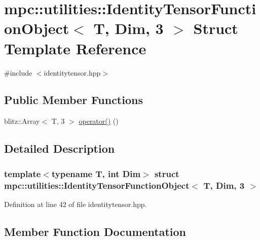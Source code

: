 \hypertarget{structmpc_1_1utilities_1_1_identity_tensor_function_object_3_01_t_00_01_dim_00_013_01_4}{}\section{mpc\+:\+:utilities\+:\+:Identity\+Tensor\+Function\+Object$<$ T, Dim, 3 $>$ Struct Template Reference}
\label{structmpc_1_1utilities_1_1_identity_tensor_function_object_3_01_t_00_01_dim_00_013_01_4}


{\ttfamily \#include $<$identitytensor.\+hpp$>$}

\subsection*{Public Member Functions}
\begin{DoxyCompactItemize}
\item 
blitz\+::\+Array$<$ T, 3 $>$ \mbox{\hyperlink{structmpc_1_1utilities_1_1_identity_tensor_function_object_3_01_t_00_01_dim_00_013_01_4_a43e6ea3f90dd5a32a4b20db3854633ac}{operator()}} ()
\end{DoxyCompactItemize}


\subsection{Detailed Description}
\subsubsection*{template$<$typename T, int Dim$>$\newline
struct mpc\+::utilities\+::\+Identity\+Tensor\+Function\+Object$<$ T, Dim, 3 $>$}



Definition at line 42 of file identitytensor.\+hpp.



\subsection{Member Function Documentation}
\mbox{\label{structmpc_1_1utilities_1_1_identity_tensor_function_object_3_01_t_00_01_dim_00_013_01_4_a43e6ea3f90dd5a32a4b20db3854633ac}} 
